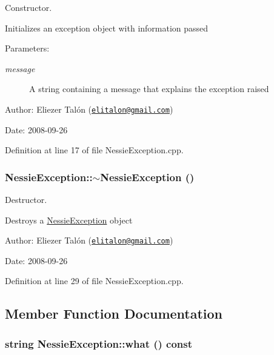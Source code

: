 Constructor. 

Initializes an exception object with information passed

\begin{Desc}
\item[Parameters:]
\begin{description}
\item[{\em message}]A string containing a message that explains the exception raised\end{description}
\end{Desc}
\begin{Desc}
\item[Author:]Eliezer Talón (\href{mailto:elitalon@gmail.com}{\tt elitalon@gmail.com}) \end{Desc}
\begin{Desc}
\item[Date:]2008-09-26 \end{Desc}


Definition at line 17 of file NessieException.cpp.\hypertarget{class_nessie_exception_19f44d2725dd53e2f10505a88e5773f2}{
\subsubsection[$\sim$NessieException]{\setlength{\rightskip}{0pt plus 5cm}NessieException::$\sim$NessieException ()}}
\label{class_nessie_exception_19f44d2725dd53e2f10505a88e5773f2}


Destructor. 

Destroys a \hyperlink{class_nessie_exception}{NessieException} object

\begin{Desc}
\item[Author:]Eliezer Talón (\href{mailto:elitalon@gmail.com}{\tt elitalon@gmail.com}) \end{Desc}
\begin{Desc}
\item[Date:]2008-09-26 \end{Desc}


Definition at line 29 of file NessieException.cpp.

\subsection{Member Function Documentation}
\hypertarget{class_nessie_exception_ec94145f2fd5febb7ca0b7587652b777}{
\subsubsection[what]{\setlength{\rightskip}{0pt plus 5cm}string NessieException::what () const}}
\label{class_nessie_exception_ec94145f2fd5febb7ca0b7587652b777}


